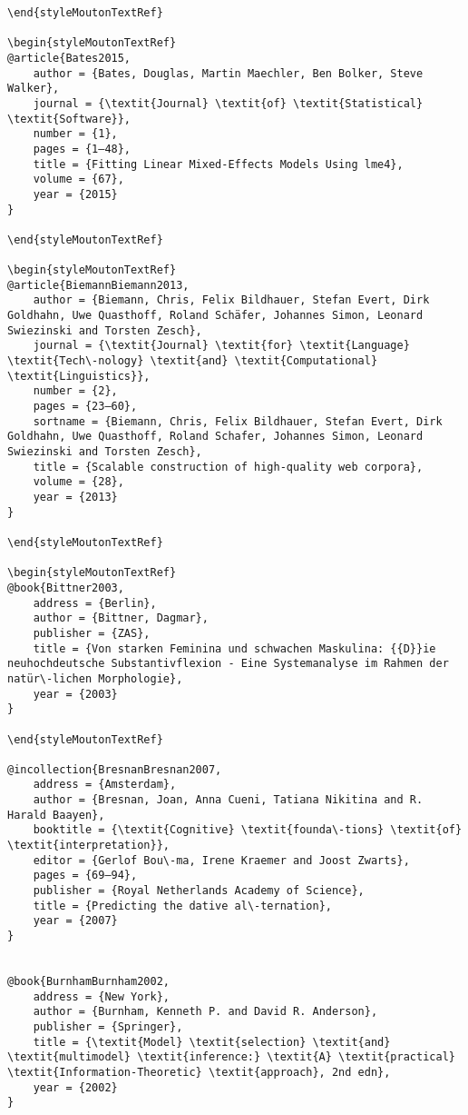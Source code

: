 \begin{styleMoutonHeadingi}
\begin{verbatim}
\end{styleMoutonTextRef}

\begin{styleMoutonTextRef}
@article{Bates2015,
	author = {Bates, Douglas, Martin Maechler, Ben Bolker, Steve Walker},
	journal = {\textit{Journal} \textit{of} \textit{Statistical} \textit{Software}},
	number = {1},
	pages = {1–48},
	title = {Fitting Linear Mixed-Effects Models Using lme4},
	volume = {67},
	year = {2015}
}

\end{styleMoutonTextRef}

\begin{styleMoutonTextRef}
@article{BiemannBiemann2013,
	author = {Biemann, Chris, Felix Bildhauer, Stefan Evert, Dirk Goldhahn, Uwe Quasthoff, Roland Schäfer, Johannes Simon, Leonard Swiezinski and Torsten Zesch},
	journal = {\textit{Journal} \textit{for} \textit{Language} \textit{Tech\-nology} \textit{and} \textit{Computational} \textit{Linguistics}},
	number = {2},
	pages = {23–60},
	sortname = {Biemann, Chris, Felix Bildhauer, Stefan Evert, Dirk Goldhahn, Uwe Quasthoff, Roland Schafer, Johannes Simon, Leonard Swiezinski and Torsten Zesch},
	title = {Scalable construction of high-quality web corpora},
	volume = {28},
	year = {2013}
}

\end{styleMoutonTextRef}

\begin{styleMoutonTextRef}
@book{Bittner2003,
	address = {Berlin},
	author = {Bittner, Dagmar},
	publisher = {ZAS},
	title = {Von starken Feminina und schwachen Maskulina: {{D}}ie neuhochdeutsche Substantivflexion - Eine Systemanalyse im Rahmen der natür\-lichen Morphologie},
	year = {2003}
}

\end{styleMoutonTextRef}

@incollection{BresnanBresnan2007,
	address = {Amsterdam},
	author = {Bresnan, Joan, Anna Cueni, Tatiana Nikitina and R. Harald Baayen},
	booktitle = {\textit{Cognitive} \textit{founda\-tions} \textit{of} \textit{interpretation}},
	editor = {Gerlof Bou\-ma, Irene Kraemer and Joost Zwarts},
	pages = {69–94},
	publisher = {Royal Netherlands Academy of Science},
	title = {Predicting the dative al\-ternation},
	year = {2007}
}


@book{BurnhamBurnham2002,
	address = {New York},
	author = {Burnham, Kenneth P. and David R. Anderson},
	publisher = {Springer},
	title = {\textit{Model} \textit{selection} \textit{and} \textit{multimodel} \textit{inference:} \textit{A} \textit{practical} \textit{Information-Theoretic} \textit{approach}, 2nd edn},
	year = {2002}
}



\end{verbatim}
\end{styleMoutonHeadingi}
